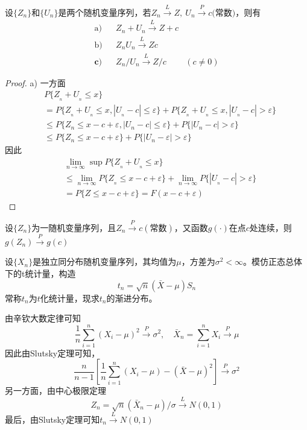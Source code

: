 \begin{theorem}[Slutsky定理]
    设$\{Z_n\}$和$\{ U_n \}$是两个随机变量序列，若$Z_{n}\xrightarrow{L}Z,\ U_n\xrightarrow{P}c\text{(常数)}$，则有
    \[
        \begin{array}{cccc}\text{a)}&&Z_n+U_n\xrightarrow{L}Z+c\\\text{b)}&&Z_nU_n\xrightarrow{L}Zc\\\textbf{c)}&&Z_n/U_n\xrightarrow{L}Z/c&(c\neq0)\end{array}
    \]
\end{theorem}
\begin{proof}
    a)
    一方面
    \[
        \begin{aligned}
            &P\{Z_{_n}+U_{_n}\leq x\} \\
            &=P\{Z_{_n}+U_{_n}\leq x,|U_{_n}-c|\leq{\varepsilon}\}+P\{Z_{_n}+U_{_n}\leq x,|U_{_n}-c|>\varepsilon\}  \\
            &\leq P\{Z_{n}\leq x-c+\varepsilon,|U_{n}-c|\leq\varepsilon\}+P\{|U_{n}-c|>\varepsilon\} \\
            &\leq P\{Z_{n}\leq x-c+\varepsilon\}+P\{|U_{n}-\varepsilon|>\varepsilon\}
        \end{aligned}
    \]
    因此
    \[
        \begin{aligned}
            &\lim_{n\rightarrow\infty}\sup P\{Z_{_n}+U_{_n}\leq x\} \\
            &\leq\lim_{n\to\infty}P\{Z_{_n}\leq x-c+\varepsilon\}+\lim_{n\to\infty}P\{\left|U_{_n}-c\right|>\varepsilon\} \\
            &=P\{Z\leq x-c+\varepsilon\}=F(x-c+\varepsilon)
        \end{aligned}
    \]
\end{proof}
\begin{theorem}
    设$\{ Z_n \}$为一随机变量序列，且$Z_n\overset{P}{\to} c(\text{常数})$，又函数$g(\cdot)$在点$c$处连续，则$g(Z_n)\overset{P}{\to}g(c)$
\end{theorem}
\begin{example}
    设$\{X_n\}$是独立同分布随机变量序列，其均值为$\mu$，方差为$\sigma^2<\infty$。模仿正态总体下的t统计量，构造
    \[
        t_n = \sqrt{n}\left( \bar{X}-\mu \right)S_n
    \]
    常称$t_n$为$t$化统计量，现求$t_n$的渐进分布。

    由辛钦大数定律可知
    \[
        \dfrac{1}{n}\sum\limits_{i = 1}^{n}(X_i-\mu)^2\overset{P}{\to}\sigma^2,\quad \bar{X}_n =\sum\limits_{i = 1}^{n}X_i\overset{P}{\to}\mu
    \]
    因此由Slutsky定理可知，
    \[
        \dfrac{n}{n-1}\left[ \dfrac{1}{n}\sum\limits_{i = 1}^{n}(X_i-\mu)-(\bar{X}-\mu)^2 \right]\overset{P}{\to}\sigma^2
    \]
    另一方面，由中心极限定理
    \[
        Z_n = \sqrt{n}\left( \bar{X}_n-\mu \right)/\sigma\overset{L}{\rightarrow}N(0,1)
    \]
    最后，由Slutsky定理可知$t_n\overset{L}{\to}N(0,1)$
\end{example}
